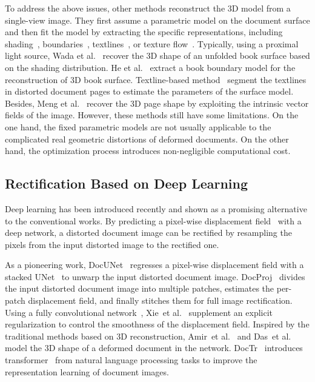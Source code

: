\documentclass[lettersize,journal]{IEEEtran}
\begin{document}
To address the above issues, other methods reconstruct the 3D model from a single-view image.
They first assume a parametric model on the document surface and then fit the model by extracting the specific representations, 
including
shading~\cite{1561180,wada1997shape}, boundaries~\cite{6628653}, textlines~\cite{1227630,958227,wu2002document,meng2011metric,luo2022geometric}, or texture flow~\cite{liang2008geometric}.
Typically,
using a proximal light source, Wada et al.~\cite{wada1997shape} recover the 3D shape of an unfolded book surface based on the shading distribution. 
He et al.~\cite{6628653} extract a book boundary model for the reconstruction of 3D book surface. 
Textline-based method~\cite{1227630,958227,wu2002document,meng2011metric} segment the textlines in distorted document pages to estimate the parameters of the surface model.
Besides, Meng et al.~\cite{meng2018exploiting} recover the 3D page shape by exploiting the intrinsic vector fields of the image.
However, these methods still have some limitations. On the one hand, the fixed parametric models are not usually applicable to the complicated real geometric distortions of deformed documents. On the other hand, the optimization process
introduces non-negligible computational cost.

\subsection{Rectification Based on Deep Learning}
Deep learning has been introduced recently and shown as a promising alternative to the conventional works.
By predicting a pixel-wise displacement field~\cite{teed2020raft} with a deep network, 
a distorted document image can be rectified by resampling the pixels from the input distorted image to the rectified one.

As a pioneering work, DocUNet~\cite{8578592} regresses a pixel-wise displacement field with a stacked UNet~\cite{ronneberger2015u} to unwarp the input distorted document image.
DocProj~\cite{li2019document} divides the input distorted document image into multiple patches, estimates the per-patch displacement field, and finally stitches them for full image rectification.
Using a fully convolutional network~\cite{long2015fully}, Xie~et al.~\cite{xie2020dewarping} supplement an explicit regularization to control the smoothness of the displacement field.
Inspired by the traditional methods based on 3D reconstruction, 
Amir~et al.~\cite{markovitz2020can} and Das~et al.~\cite{9010747} model the 3D shape of a deformed document in the network.
DocTr~\cite{feng2021doctr} introduces transformer~\cite{Vaswani2017AttentionIA} from natural language processing tasks to improve the representation learning of document images. 
\end{document}
